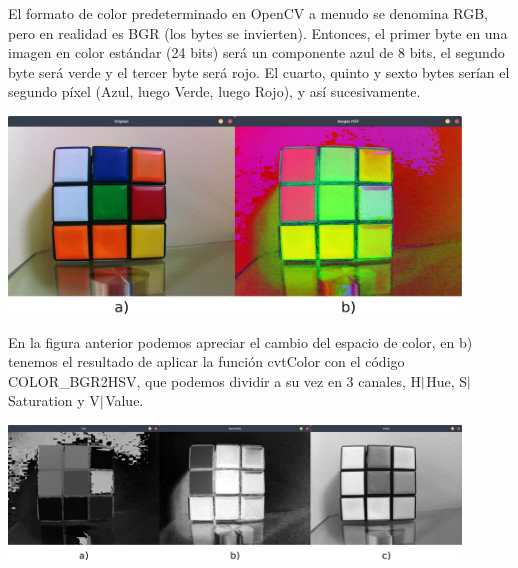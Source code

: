 El formato de color predeterminado en OpenCV a menudo se denomina RGB, pero en realidad
es BGR (los bytes se invierten). Entonces, el primer byte en una imagen en color estándar
(24 bits) será un componente azul de 8 bits, el segundo byte será verde y el tercer
byte será rojo. El cuarto, quinto y sexto bytes serían el segundo píxel (Azul, luego
Verde, luego Rojo), y así sucesivamente.
\begin{center}
	\includegraphics[width=0.9\textwidth]{Contenido/Cuerpo/Capitulo4/Fig2.eps}
	\label{Fig6}
\end{center}
En la figura anterior podemos apreciar el cambio del espacio de color, en b) tenemos el resultado de aplicar la función cvtColor
con el código COLOR\_BGR2HSV, que podemos dividir a su vez en 3 canales, H$\arrowvert$Hue, S$\arrowvert$Saturation y
V$\arrowvert$Value.
\begin{center}
	\includegraphics[width=0.9\textwidth]{Contenido/Cuerpo/Capitulo4/Fig3.eps}
	\label{Fig6}
\end{center}

